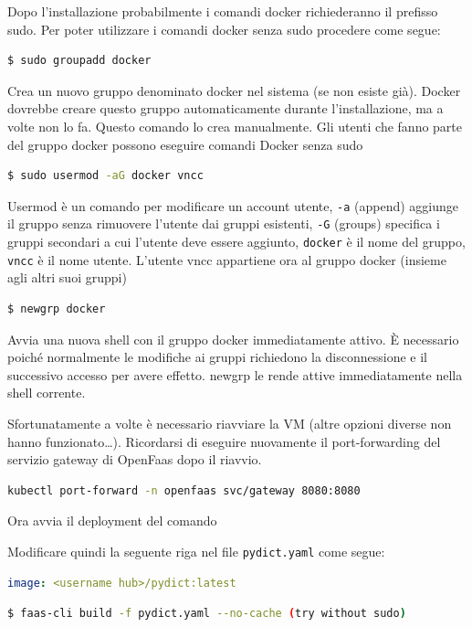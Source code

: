 \documentclass[11pt, a4paper]{article}
\begin{document}
Dopo l'installazione probabilmente i comandi docker richiederanno il prefisso sudo. Per poter utilizzare i comandi docker senza sudo procedere come segue:
\begin{lstlisting}[language=bash]
$ sudo groupadd docker
\end{lstlisting}
Crea un nuovo gruppo denominato docker nel sistema (se non esiste già). Docker dovrebbe creare questo gruppo automaticamente durante l'installazione, ma a volte non lo fa. Questo comando lo crea manualmente. Gli utenti che fanno parte del gruppo docker possono eseguire comandi Docker senza sudo

\begin{lstlisting}[language=bash]
$ sudo usermod -aG docker vncc
\end{lstlisting}
Usermod è un comando per modificare un account utente, \texttt{-a} (append) aggiunge il gruppo senza rimuovere l'utente dai gruppi esistenti, \texttt{-G} (groups) specifica i gruppi secondari a cui l'utente deve essere aggiunto, \texttt{docker} è il nome del gruppo, \texttt{vncc} è il nome utente. L'utente vncc appartiene ora al gruppo docker (insieme agli altri suoi gruppi)

\begin{lstlisting}[language=bash]
$ newgrp docker
\end{lstlisting}
Avvia una nuova shell con il gruppo docker immediatamente attivo. È necessario poiché normalmente le modifiche ai gruppi richiedono la disconnessione e il successivo accesso per avere effetto. newgrp le rende attive immediatamente nella shell corrente.

Sfortunatamente a volte è necessario riavviare la VM (altre opzioni diverse non hanno funzionato\dots). Ricordarsi di eseguire nuovamente il port-forwarding del servizio gateway di OpenFaas dopo il riavvio.

\begin{lstlisting}[language=bash]
kubectl port-forward -n openfaas svc/gateway 8080:8080
\end{lstlisting}

Ora avvia il deployment del comando

Modificare quindi la seguente riga nel file \texttt{pydict.yaml} come segue:
\begin{lstlisting}[language=yaml]
image: <username hub>/pydict:latest
\end{lstlisting}

\begin{lstlisting}[language=bash]
$ faas-cli build -f pydict.yaml --no-cache (try without sudo)
\end{lstlisting}
\end{document}
